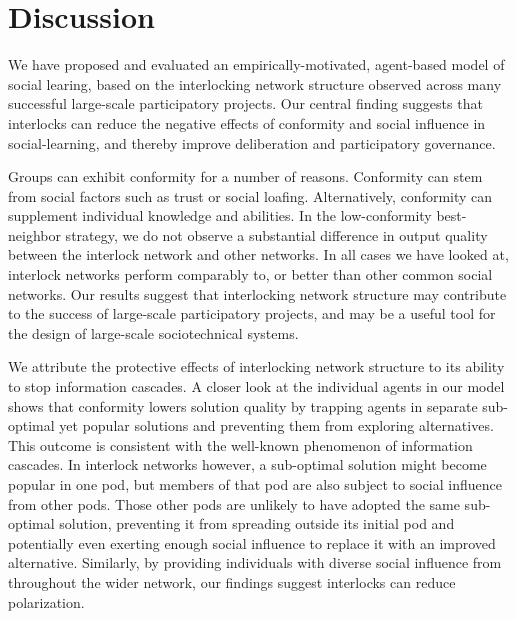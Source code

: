 \documentclass[manuscript,screen,review,acmsmall]{acmart}
\begin{document}
\section{Discussion}
We have proposed and evaluated an empirically-motivated, agent-based model of social learing,
based on the interlocking network structure observed across many successful large-scale participatory projects.
Our central finding suggests that interlocks can reduce the negative effects of conformity and social influence in social-learning,
and thereby improve deliberation and participatory governance.

Groups can exhibit conformity for a number of reasons.
Conformity can stem from social factors such as trust or social loafing.
Alternatively, conformity can supplement individual knowledge and abilities.
In the low-conformity best-neighbor strategy, we do not observe a substantial difference in output quality between the interlock network and other networks. In all cases we have looked at, interlock networks perform comparably to,
or better than other common social networks. 
Our results suggest that interlocking network structure may contribute to the success of large-scale participatory projects, and may be a useful tool for the design of large-scale sociotechnical systems.

We attribute the protective effects of interlocking network structure to its ability to stop information cascades.
A closer look at the individual agents in our model shows that conformity lowers solution quality by trapping agents in separate sub-optimal yet popular solutions and preventing them from exploring alternatives.
This outcome is consistent with the well-known phenomenon of information cascades.
In interlock networks however, a sub-optimal solution might become popular in one pod,
but members of that pod are also subject to social influence from other pods.
Those other pods are unlikely to have adopted the same sub-optimal solution,
preventing it from spreading outside its initial pod and potentially even exerting enough social influence to replace it with an improved alternative.
Similarly, by providing individuals with diverse social influence from throughout the wider network, our findings suggest interlocks can reduce polarization.
\end{document}

